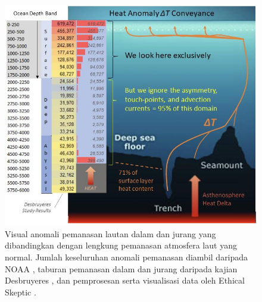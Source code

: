 \documentclass[10pt,twocolumn,letterpaper]{article}
\begin{document}
\begin{figure}[t]
\begin{center}
\includegraphics[width=1\textwidth]{deepsea.jpg}
\end{center}
   \caption{Visual anomali pemanasan lautan dalam dan jurang yang dibandingkan dengan lengkung pemanasan atmosfera laut yang normal. Jumlah keseluruhan anomali pemanasan diambil daripada NOAA \cite{147}, taburan pemanasan dalam dan jurang daripada kajian Desbruyeres \cite{132}, dan pemprosesan serta visualisasi data oleh Ethical Skeptic \cite{129}.}
\label{fig:21}
\end{figure}
\end{document}
